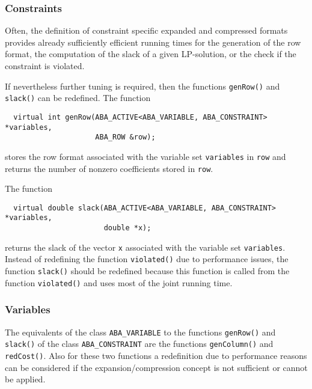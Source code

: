 \subsubsection{Constraints}

Often, the definition of constraint specific expanded and compressed
formats provides already sufficiently efficient running times for the
generation of the row format, the computation of the slack of a given
LP-solution, or the check if the constraint is violated.

If nevertheless further tuning is required, then the functions
{\tt genRow()} and 
{\tt slack()} can be redefined.
The function
\begin{verbatim}
  virtual int genRow(ABA_ACTIVE<ABA_VARIABLE, ABA_CONSTRAINT> *variables, 
                     ABA_ROW &row);
\end{verbatim}
\noindent
stores the row format associated with the variable set {\tt variables} in {\tt row}
and returns the number of nonzero coefficients stored in {\tt row}.

The function
\begin{verbatim}
  virtual double slack(ABA_ACTIVE<ABA_VARIABLE, ABA_CONSTRAINT> *variables, 
                       double *x);
\end{verbatim}
\noindent
returns the slack of the vector {\tt x} associated with the variable set 
{\tt variables}. Instead of redefining the function {\tt violated()} 
due to performance issues, the function {\tt slack()} should be redefined because
this function is called from the function {\tt violated()} and uses most of the joint
running time.

\subsubsection{Variables}

The equivalents of the class {\tt ABA\_VARIABLE} to the functions {\tt genRow()}
and {\tt slack()} of the class {\tt ABA\_CON\-STRAINT} are the functions
{\tt genColumn()}
and {\tt redCost()}. 
Also for these two functions
a redefinition due to performance reasons can be considered if the
expansion/compression concept is not sufficient or cannot be applied.


